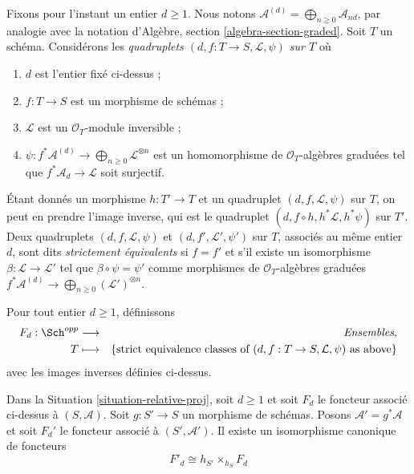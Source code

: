 \medskip\noindent
Fixons pour l'instant un entier $d \geq 1$. Nous notons
$\mathcal{A}^{(d)} = \bigoplus_{n \geq 0} \mathcal{A}_{nd}$, par analogie
avec la notation d'Algèbre, section \ref{algebra-section-graded}.
Soit $T$ un schéma. Considérons les {\it quadruplets
$(d, f : T \to S, \mathcal{L}, \psi)$ sur $T$} où
\begin{enumerate}
\item $d$ est l'entier fixé ci-dessus ;
\item $f : T \to S$ est un morphisme de schémas ;
\item $\mathcal{L}$ est un $\mathcal{O}_T$-module inversible ;
\item
$\psi : f^*\mathcal{A}^{(d)} \to \bigoplus_{n \geq 0}\mathcal{L}^{\otimes n}$
est un homomorphisme de $\mathcal{O}_T$-algèbres graduées tel que
$f^*\mathcal{A}_d \to \mathcal{L}$ soit surjectif.
\end{enumerate}
Étant donnés un morphisme $h : T' \to T$ et un quadruplet
$(d, f, \mathcal{L}, \psi)$ sur $T$, on peut en prendre l'image inverse,
qui est le quadruplet $(d, f \circ h, h^*\mathcal{L}, h^*\psi)$ sur $T'$.
Deux quadruplets $(d, f, \mathcal{L}, \psi)$ et
$(d, f', \mathcal{L}', \psi')$ sur $T$, associés au même entier $d$, sont
dits {\it strictement équivalents} si
$f = f'$ et s'il existe un isomorphisme
$\beta : \mathcal{L} \to \mathcal{L}'$ tel que $\beta \circ \psi = \psi'$
comme morphismes de $\mathcal{O}_T$-algèbres graduées
$f^*\mathcal{A}^{(d)} \to \bigoplus_{n \geq 0} (\mathcal{L}')^{\otimes n}$.

\medskip\noindent
Pour tout entier $d \geq 1$, définissons
\begin{eqnarray*}
F_d : \Sch^{opp} & \longrightarrow & \textit{Ensembles}, \\
T & \longmapsto &
\{\text{strict equivalence classes of }
(d, f : T \to S, \mathcal{L}, \psi)
\text{ as above}\}
\end{eqnarray*}
avec les images inverses définies ci-dessus.

\begin{lemma}
\label{lemma-proj-base-change}
Dans la Situation \ref{situation-relative-proj},
soit $d \geq 1$ et soit
$F_d$ le foncteur associé ci-dessus à $(S, \mathcal{A})$.
Soit $g : S' \to S$ un morphisme de schémas. Posons
$\mathcal{A}' = g^*\mathcal{A}$ et
soit $F_d'$ le foncteur associé à
$(S', \mathcal{A}')$. Il existe un
isomorphisme canonique de foncteurs
$$
F'_d \cong h_{S'} \times_{h_S} F_d
$$
\end{lemma}

